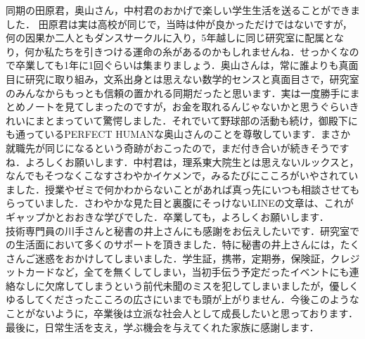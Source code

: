 \quad 同期の田原君，奥山さん，中村君のおかげで楽しい学生生活を送ることができました． 田原君は実は高校が同じで，当時は仲が良かっただけではないですが，何の因果か二人ともダンスサークルに入り，5年越しに同じ研究室に配属となり，何か私たちを引きつける運命の糸があるのかもしれませんね．せっかくなので卒業しても1年に1回ぐらいは集まりましょう．奥山さんは，常に誰よりも真面目に研究に取り組み，文系出身とは思えない数学的センスと真面目さで，研究室のみんなからもっとも信頼の置かれる同期だったと思います．実は一度勝手にまとめノートを見てしまったのですが，お金を取れるんじゃないかと思うぐらいきれいにまとまっていて驚愕しました．それでいて野球部の活動も続け，御殿下にも通っているPERFECT HUMANな奥山さんのことを尊敬しています．まさか就職先が同じになるという奇跡がおこったので，まだ付き合いが続きそうですね．よろしくお願いします．中村君は，理系東大院生とは思えないルックスと，なんでもそつなくこなすさわやかイケメンで，みるたびにこころがいやされていました．授業やゼミで何かわからないことがあれば真っ先にいつも相談させてもらっていました．さわやかな見た目と裏腹にそっけないLINEの文章は、これがギャップかとおおきな学びでした．卒業しても，よろしくお願いします．\\
\quad 技術専門員の川手さんと秘書の井上さんにも感謝をお伝えしたいです．研究室での生活面において多くのサポートを頂きました．特に秘書の井上さんには，たくさんご迷惑をおかけしてしまいました．学生証，携帯，定期券，保険証，クレジットカードなど，全てを無くしてしまい，当初手伝う予定だったイベントにも連絡なしに欠席してしまうという前代未聞のミスを犯してしまいましたが，優しくゆるしてくださったこころの広さにいまでも頭が上がりません．今後このようなことがないように，卒業後は立派な社会人として成長したいと思っております．\\
\quad 最後に，日常生活を支え，学ぶ機会を与えてくれた家族に感謝します．

